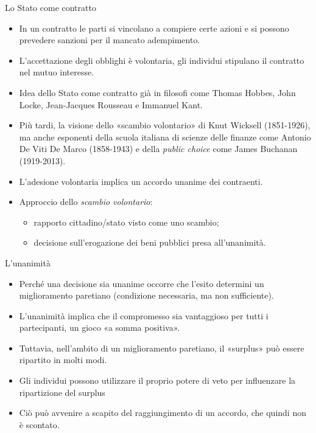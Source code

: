 \documentclass[aspectratio=64,12pt]{beamer}
\begin{document}
\begin{frame}{Lo Stato come contratto}
\begin{itemize}
\item In un contratto le parti si vincolano a compiere certe azioni e si possono
prevedere sanzioni per il mancato adempimento.
\item L'accettazione degli obblighi è volontaria, gli individui stipulano il
  contratto nel mutuo interesse.
\item Idea dello Stato come contratto già in filosofi come Thomas Hobbes, John
Locke, Jean-Jacques Rousseau e Immanuel Kant.
\item Più tardi, la visione dello «scambio volontario» di Knut Wicksell
(1851-1926), ma anche esponenti della scuola italiana di scienze delle
finanze come Antonio De Viti De Marco (1858-1943) e della \emph{public choice}
come James Buchanan (1919-2013).
\item L'adesione volontaria implica un accordo unanime dei contraenti.
\item Approccio dello \emph{scambio volontario}:
\begin{itemize}
\item rapporto cittadino/stato visto come uno scambio;
\item decisione sull'erogazione dei beni pubblici presa all'\alert{unanimità}.
\end{itemize}
\end{itemize}
\end{frame}

\begin{frame}{L'unanimità}
\begin{itemize}
\item Perché una decisione sia unanime occorre che l'esito determini un
miglioramento paretiano (condizione necessaria, ma non sufficiente).
\item L'unanimità implica che il compromesso sia vantaggioso per tutti i
  partecipanti, un gioco «a somma positiva».
\item Tuttavia, nell'ambito di un miglioramento paretiano, il «surplus» può essere
ripartito in molti modi.
\item Gli individui possono utilizzare il proprio potere di veto per influenzare
  la ripartizione del surplus
\item Ciò può avvenire a scapito del raggiungimento di un accordo, che quindi
  non è scontato.
\end{itemize}
\end{frame}
\end{document}
